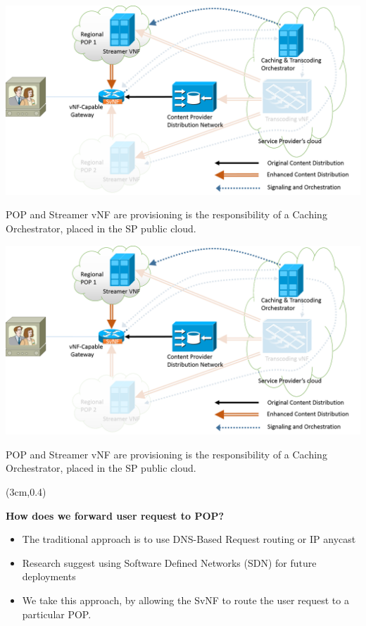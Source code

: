 \documentclass[a4paper]{beamer}
\begin{document}
\begin{frame}{}
	\centering
	\includegraphics[width=0.95\linewidth]{highleveldesign3.png}
	\vspace{2em}
	\begin{block}{}
		POP and Streamer vNF are provisioning is the responsibility of a Caching Orchestrator, placed in the SP public cloud.
	\end{block}
\end{frame}

\begin{frame}{}
	\centering
	\includegraphics[width=0.95\linewidth]{highleveldesign3.png}
	\vspace{2em}
	\begin{block}{}
		POP and Streamer vNF are provisioning is the responsibility of a Caching Orchestrator, placed in the SP public cloud.
	\end{block}
		\begin{textblock*}{8cm}(3cm,0.4\textheight)
		\begin{alertblock}{}
			\textbf{ How does we forward user request to POP? }
			\begin{itemize}
				\item The traditional approach is to use DNS-Based Request routing or IP anycast
				\item Research suggest using Software Defined Networks (SDN) for future deployments
				\item We take this approach, by allowing the SvNF to route the user request to a particular POP.
			\end{itemize}
		\end{alertblock}
	\end{textblock*}		
\end{frame}
\end{document}
